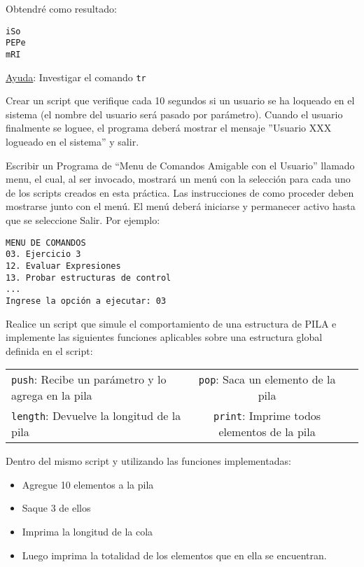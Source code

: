 \begin{questions}
Obtendré como resultado:

\begin{verbatim}
iSo
PEPe
mRI
\end{verbatim}

\underline{Ayuda}: Investigar el comando \texttt{tr}

\item Crear un script que verifique cada 10 segundos si un usuario se ha loqueado en el sistema (el nombre del usuario será pasado por parámetro). Cuando el usuario finalmente se loguee, el programa deberá mostrar el mensaje ”Usuario XXX logueado en el sistema” y salir.

\item Escribir un Programa de “Menu de Comandos Amigable con el Usuario” llamado menu, el cual, al ser invocado, mostrará un menú con la selección para cada uno de los scripts creados en esta práctica. Las instrucciones de como proceder deben mostrarse junto con el menú. El menú deberá iniciarse y permanecer activo hasta que se seleccione Salir. Por ejemplo:

\begin{verbatim}
MENU DE COMANDOS
03. Ejercicio 3
12. Evaluar Expresiones
13. Probar estructuras de control
...
Ingrese la opción a ejecutar: 03
\end{verbatim}

\item Realice un script que simule el comportamiento de una estructura de PILA e implemente las siguientes funciones aplicables sobre una estructura global definida en el script:

\begin{tabular}{ l c r }
  \texttt{push}: Recibe un parámetro y lo agrega en la pila & \texttt{pop}: Saca un elemento de la pila \\
  \texttt{length}: Devuelve la longitud de la pila & \texttt{print}: Imprime todos elementos de la pila \\
\end{tabular}

\item Dentro del mismo script y utilizando las funciones implementadas:
\begin{itemize}
\item Agregue 10 elementos a la pila 
\item Saque 3 de ellos 
\item Imprima la longitud de la cola 
\item Luego imprima la totalidad de los elementos que en ella se encuentran.
\end{itemize}


\end{questions}
